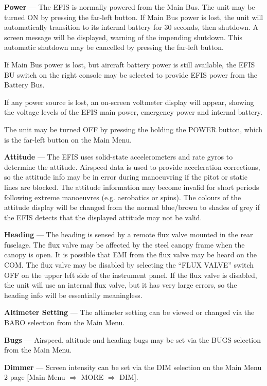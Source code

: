 \textbf{Power} --- The EFIS is normally powered from the Main Bus. The unit may be turned ON by pressing the far-left button. If Main Bus power is lost, the unit will automatically transition to its internal battery for 30 seconds, then shutdown. A screen message will be displayed, warning of the impending shutdown. This automatic shutdown may be cancelled by pressing the far-left button.

If Main Bus power is lost, but aircraft battery power is still available, the EFIS BU switch on the right console may be selected to provide EFIS power from the Battery Bus.

If any power source is lost, an on-screen voltmeter display will appear, showing the voltage levels of the EFIS main power, emergency power and internal battery.

The unit may be turned OFF by pressing the holding the POWER button, which is the far-left button on the Main Menu.

\textbf{Attitude} --- The EFIS uses solid-state accelerometers and rate gyros to determine the attitude. Airspeed data is used to provide acceleration corrections, so the attitude info may be in error during manoeuvring if the pitot or static lines are blocked. The attitude information may become invalid for short periods following extreme manoeuvres (e.g. aerobatics or spins). The colours of the attitude display will be changed from the normal blue/brown to shades of grey if the EFIS detects that the displayed attitude may not be valid.

\textbf{Heading} --- The heading is sensed by a remote flux valve mounted in the rear fuselage. The flux valve may be affected by the steel canopy frame when the canopy is open. It is possible that EMI from the flux valve may be heard on the COM. The flux valve may be disabled by selecting the ``FLUX VALVE'' switch OFF on the upper left side of the instrument panel. If the flux valve is disabled, the unit will use an internal flux valve, but it has very large errors, so the heading info will be essentially meaningless.

\textbf{Altimeter Setting} --- The altimeter setting can be viewed or changed via the BARO selection from the Main Menu.

\textbf{Bugs} --- Airspeed, altitude and heading bugs may be set via the BUGS selection from the Main Menu.

\textbf{Dimmer} --- Screen intensity can be set via the DIM selection on the Main Menu 2 page {[}Main Menu $\Rightarrow$ MORE $\Rightarrow$ DIM{]}.

